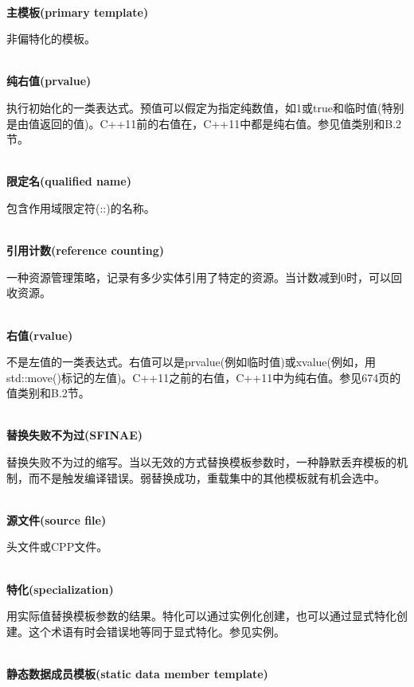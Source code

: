 \hspace*{\fill} \\ %
\noindent
\textbf{主模板(primary template)}

非偏特化的模板。

\hspace*{\fill} \\ %
\noindent
\textbf{纯右值(prvalue)}

执行初始化的一类表达式。预值可以假定为指定纯数值，如1或true和临时值(特别是由值返回的值)。C++11前的右值在，C++11中都是纯右值。参见值类别和B.2节。

\hspace*{\fill} \\ %
\noindent
\textbf{限定名(qualified name)}

包含作用域限定符(::)的名称。

\hspace*{\fill} \\ %
\noindent
\textbf{引用计数(reference counting)}

一种资源管理策略，记录有多少实体引用了特定的资源。当计数减到0时，可以回收资源。

\hspace*{\fill} \\ %
\noindent
\textbf{右值(rvalue)}

不是左值的一类表达式。右值可以是prvalue(例如临时值)或xvalue(例如，用std::move()标记的左值)。C++11之前的右值，C++11中为纯右值。参见674页的值类别和B.2节。

\hspace*{\fill} \\ %
\noindent
\textbf{替换失败不为过(SFINAE)}

替换失败不为过的缩写。当以无效的方式替换模板参数时，一种静默丢弃模板的机制，而不是触发编译错误。弱替换成功，重载集中的其他模板就有机会选中。

\hspace*{\fill} \\ %
\noindent
\textbf{源文件(source file)}

头文件或CPP文件。

\hspace*{\fill} \\ %
\noindent
\textbf{特化(specialization)}

用实际值替换模板参数的结果。特化可以通过实例化创建，也可以通过显式特化创建。这个术语有时会错误地等同于显式特化。参见实例。

\hspace*{\fill} \\ %
\noindent
\textbf{静态数据成员模板(static data member template)}

